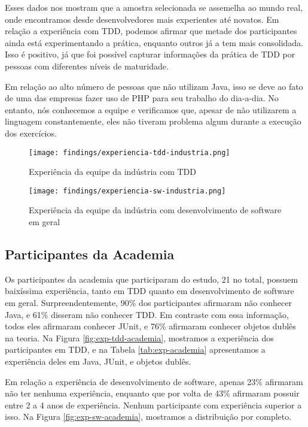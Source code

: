 Esses dados nos mostram que a amostra selecionada se assemelha ao mundo real, onde
encontramos desde desenvolvedores mais experientes até novatos. Em relação a experiência com TDD,
podemos afirmar que metade dos participantes ainda está experimentando a prática, enquanto
outros já a tem mais consolidada. Isso é positivo, já que foi possível capturar informações
da prática de TDD por pessoas com diferentes níveis de maturidade.

Em relação ao alto número de pessoas que não utilizam Java, isso se deve ao fato de uma das
empresas fazer uso de PHP para seu trabalho do dia-a-dia. No entanto, nós conhecemos a equipe
e verificamos que, apesar de não utilizarem a linguagem constantemente, eles não tiveram
problema algum durante a execução dos exercícios.

\begin{figure}[h!]
  \centering
  \texttt{[image: findings/experiencia-tdd-industria.png]}
  \caption{Experiência da equipe da indústria com TDD}
  \label{fig:exp-tdd-industria}
\end{figure}

\begin{figure}[h!]
  \centering
  \texttt{[image: findings/experiencia-sw-industria.png]}
  \caption{Experiência da equipe da indústria com desenvolvimento de software em geral}
  \label{fig:exp-sw-industria}
\end{figure}

\subsection{Participantes da Academia}
\label{findings-desc-academia}

Os participantes da academia que participaram do estudo, 21 no total, possuem baixíssima experiência,
tanto em TDD quanto em desenvolvimento de software em geral. Surpreendentemente, 90\%
dos participantes afirmaram não conhecer Java, e 61\% disseram não conhecer TDD.
Em contraste com essa informação, todos eles afirmaram conhecer JUnit, e 76\% afirmaram
conhecer objetos dublês na teoria. 
Na Figura \ref{fig:exp-tdd-academia}, mostramos a experiência dos participantes em TDD, e
na Tabela \ref{tab:exp-academia} apresentamos a experiência deles em Java, JUnit, e objetos
dublês.

Em relação a experiência de desenvolvimento de software, apenas 23\% afirmaram não
ter nenhuma experiência, enquanto que por volta de 43\% afirmaram possuir
entre 2 a 4 anos de experiência. Nenhum participante com experiência superior a isso.
Na Figura \ref{fig:exp-sw-academia}, mostramos a distribuição por completo.

